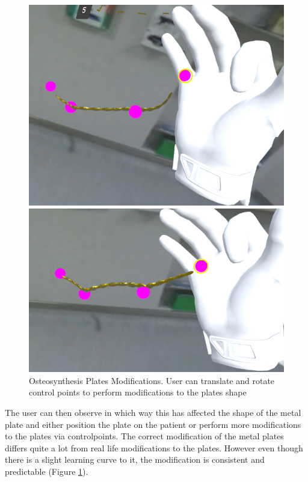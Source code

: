 \begin{figure}
  \centering
  \begin{minipage}{.5\textwidth}
    \centering
    \includegraphics[width=0.95\linewidth]{images/implementation/features/procedures/metal_plates_2.png}
  \end{minipage}%
  \begin{minipage}{.5\textwidth}
    \centering
    \includegraphics[width=0.95\linewidth]{images/implementation/features/procedures/metal_plates_3.png}
  \end{minipage}
  \caption{\label{fig::FeatureMetalPlate2}Osteosynthesis Plates Modifications. User can translate and rotate control points to perform modifications to the plates shape} 
\end{figure}

The user can then observe in which way this has affected the shape of the metal plate and either position the plate on the patient or perform more modifications to the plates via controlpoints.
The correct modification of the metal plates differs quite a lot from real life modifications to the plates.
However even though there is a slight learning curve to it, the modification is consistent and predictable (Figure \ref{fig::FeatureMetalPlate2}).

